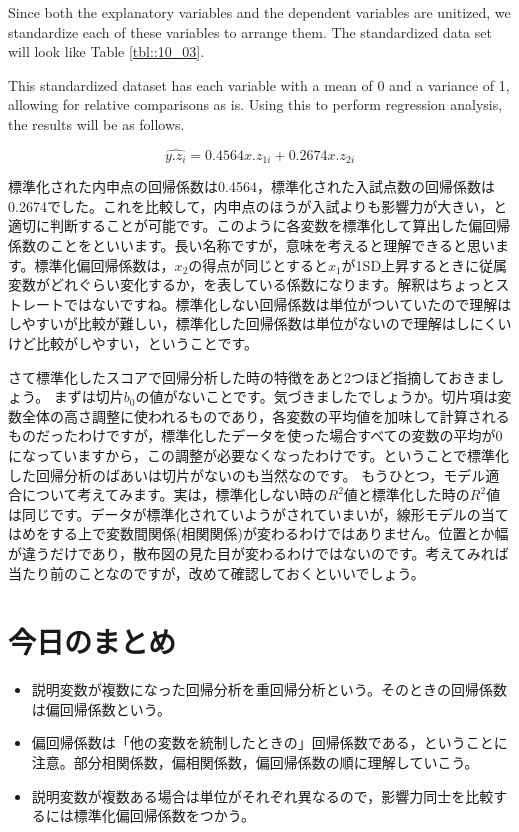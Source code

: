 \documentclass{ltjbook}
\begin{document}
Since both the explanatory variables and the dependent variables are unitized, we standardize each of these variables to arrange them. The standardized data set will look like Table \ref{tbl::10_03}.



This standardized dataset has each variable with a mean of 0 and a variance of 1, allowing for relative comparisons as is. Using this to perform regression analysis, the results will be as follows.

\[ \hat{y.z_i} = 0.4564 x.z_{1i} + 0.2674 x.z_{2i} \]

標準化された内申点の回帰係数は0.4564，標準化された入試点数の回帰係数は0.2674でした。これを比較して，内申点のほうが入試よりも影響力が大きい，と適切に判断することが可能です。このように各変数を標準化して算出した偏回帰係数のことをといいます。長い名称ですが，意味を考えると理解できると思います。標準化偏回帰係数は，$x_2$の得点が同じとすると$x_1$が1SD上昇するときに従属変数がどれぐらい変化するか，を表している係数になります。解釈はちょっとストレートではないですね。標準化しない回帰係数は単位がついていたので理解はしやすいが比較が難しい，標準化した回帰係数は単位がないので理解はしにくいけど比較がしやすい，ということです。

さて標準化したスコアで回帰分析した時の特徴をあと2つほど指摘しておきましょう。
まずは切片$b_0$の値がないことです。気づきましたでしょうか。切片項は変数全体の高さ調整に使われるものであり，各変数の平均値を加味して計算されるものだったわけですが，標準化したデータを使った場合すべての変数の平均が0になっていますから，この調整が必要なくなったわけです。ということで標準化した回帰分析のばあいは切片がないのも当然なのです。
もうひとつ，モデル適合について考えてみます。実は，標準化しない時の$R^2$値と標準化した時の$R^2$値は同じです。データが標準化されていようがされていまいが，線形モデルの当てはめをする上で変数間関係(相関関係)が変わるわけではありません。位置とか幅が違うだけであり，散布図の見た目が変わるわけではないのです。考えてみれば当たり前のことなのですが，改めて確認しておくといいでしょう。


\section{今日のまとめ}
\begin{itemize}
	\item 説明変数が複数になった回帰分析を重回帰分析という。そのときの回帰係数は偏回帰係数という。
	\item 偏回帰係数は「他の変数を統制したときの」回帰係数である，ということに注意。部分相関係数，偏相関係数，偏回帰係数の順に理解していこう。
	\item 説明変数が複数ある場合は単位がそれぞれ異なるので，影響力同士を比較するには標準化偏回帰係数をつかう。
\end{itemize}
\end{document}

